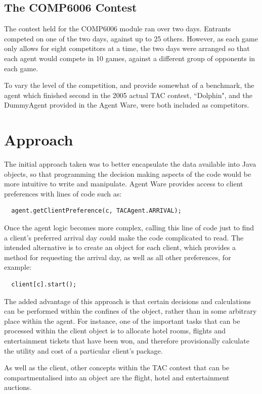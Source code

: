 \documentclass{acm_proc_article-sp}
\begin{document}
 \subsection{The COMP6006 Contest}
 
 The contest held for the COMP6006 module ran over two days.  Entrants competed on one of the two days, against up to 25 others.  However, as each game only allows for eight competitors at a time, the two days were arranged so that each agent would compete in 10 games, against a different group of opponents in each game.
 
 To vary the level of the competition, and provide somewhat of a benchmark, the agent which finished second in the 2005 actual TAC contest, ``Dolphin", and the DummyAgent provided in the Agent Ware, were both included as competitors.
 
\section{Approach}
 \label{approach}

 The initial approach taken was to better encapsulate the data available into Java objects, so that programming the decision making aspects of the code would be more intuitive to write and manipulate.  Agent Ware provides access to client preferences with lines of code such as:
 \begin{verbatim}
  agent.getClientPreference(c, TACAgent.ARRIVAL);
 \end{verbatim}
 Once the agent logic becomes more complex, calling this line of code just to find a client's preferred arrival day could make the code complicated to read.  The intended alternative is to create an object for each client, which provides a method for requesting the arrival day, as well as all other preferences, for example:
 \begin{verbatim}
  client[c].start();
 \end{verbatim}
 The added advantage of this approach is that certain decisions and calculations can be performed within the confines of the object, rather than in some arbitrary place within the agent.  For instance, one of the important tasks that can be processed within the client object is to allocate hotel rooms, flights and entertainment tickets that have been won, and therefore provisionally calculate the utility and cost of a particular client's package.
 
 As well as the client, other concepts within the TAC contest that can be compartmentalised into an object are the flight, hotel and entertainment auctions.
 
\end{document}
